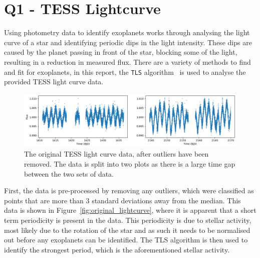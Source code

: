 
\section{Q1 - TESS Lightcurve}\label{sec:q1}
Using photometry data to identify exoplanets works through analysing the light curve of a star and identifying
periodic dips in the light intensity.
These dips are caused by the planet passing in front of the star, blocking some of the light, resulting in a
reduction in measured flux.
There are a variety of methods to find and fit for exoplanets, in this report, the \texttt{TLS} algorithm~\cite{hippke2019}
is used to analyse the provided TESS light curve data.

\begin{figure}[htb]
    \centering
    \includegraphics[width=1\textwidth]{figures/original_lightcurve}
    \caption{The original TESS light curve data, after outliers have been removed. The data is split into two
    plots as there is a large time gap between the two sets of data.}
    \label{fig:original_lightcurve}
\end{figure}

First, the data is pre-processed by removing any outliers, which were classified as points that are more than 3 standard
deviations away from the median.
This data is shown in Figure~\eqref{fig:original_lightcurve}, where it is apparent that a short term periodicity is
present in the data.
This periodicity is due to stellar activity, most likely due to the rotation of the star and as such it needs to be normalised
out before any exoplanets can be identified.
The TLS algorithm is then used to identify the strongest period, which is the aforementioned stellar activity.

